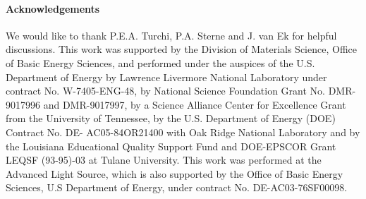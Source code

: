 \paragraph*{Acknowledgements}

\noindent We would like to thank P.E.A. Turchi, P.A. Sterne and J. van
Ek for helpful discussions.  This work was supported by the Division
of Materials Science, Office of Basic Energy Sciences, and performed
under the auspices of the U.S. Department of Energy by Lawrence
Livermore National Laboratory under contract No.  W-7405-ENG-48, by
National Science Foundation Grant No. DMR-9017996 and DMR-9017997, by
a Science Alliance Center for Excellence Grant from the University of
Tennessee, by the U.S. Department of Energy (DOE) Contract No. DE-
AC05-84OR21400 with Oak Ridge National Laboratory and by the Louisiana
Educational Quality Support Fund and DOE-EPSCOR Grant LEQSF (93-95)-03
at Tulane University.  This work was performed at the Advanced Light
Source, which is also supported by the Office of Basic Energy
Sciences, U.S Department of Energy, under contract
No. DE-AC03-76SF00098.


\clearpage

